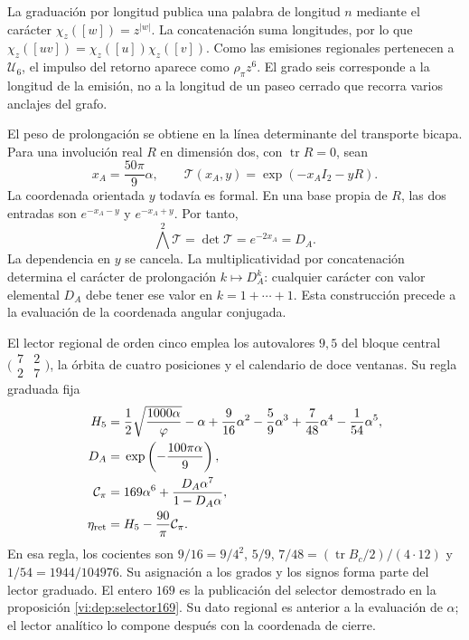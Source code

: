 La graduación por longitud publica una palabra de longitud \(n\)
mediante el carácter \(\chi_z([w])=z^{|w|}\). La concatenación
suma longitudes, por lo que
\(\chi_z([uv])=\chi_z([u])\chi_z([v])\). Como las emisiones
regionales pertenecen a \(\mathcal U_6\), el impulso del retorno
aparece como \(\rho_\pi z^6\). El grado seis corresponde a la
longitud de la emisión, no a la longitud de un paseo cerrado que
recorra varios anclajes del grafo.

El peso de prolongación se obtiene en la línea determinante del
transporte bicapa. Para una involución real \(R\) en dimensión dos,
con \(\operatorname{tr}R=0\), sean
\[
 x_A=\frac{50\pi}{9}\alpha,\qquad
 \mathcal T(x_A,y)=\exp(-x_AI_2-yR).
\]
La coordenada orientada \(y\) todavía es formal. En una base propia
de \(R\), las dos entradas son \(e^{-x_A-y}\) y
\(e^{-x_A+y}\). Por tanto,
\[
 \bigwedge^2\mathcal T=\det\mathcal T
 =e^{-2x_A}=D_A.
\]
La dependencia en \(y\) se cancela. La multiplicatividad por
concatenación determina el carácter de prolongación \(k\mapsto D_A^k\):
cualquier carácter con valor elemental \(D_A\) debe tener ese valor
en \(k=1+\cdots+1\). Esta construcción precede a la evaluación
de la coordenada angular conjugada.

El lector regional de orden cinco emplea los autovalores \(9,5\)
del bloque central \(\bigl(\begin{smallmatrix}7&2\\2&7\end{smallmatrix}\bigr)\),
la órbita de cuatro posiciones y el calendario de doce ventanas.
Su regla graduada fija
\begin{align}
 H_5={}&\frac12\sqrt{\frac{1000\alpha}{\varphi}}-\alpha
       +\frac9{16}\alpha^2-\frac59\alpha^3
       +\frac7{48}\alpha^4-\frac1{54}\alpha^5,\notag\\
 D_A={}&\exp\left(-\frac{100\pi\alpha}{9}\right),\notag\\
 \mathcal C_\pi={}&169\alpha^6+
                  \frac{D_A\alpha^7}{1-D_A\alpha},\notag\\
 \eta_{\rm ret}={}&H_5-\frac{90}{\pi}\mathcal C_\pi.
 \label{vi:dep:mantisas}
\end{align}
En esa regla, los cocientes son
\(9/16=9/4^2\), \(5/9\), \(7/48=(\operatorname{tr}B_c/2)/(4\cdot12)\)
y \(1/54=1944/104976\). Su asignación a los grados y los signos
forma parte del lector graduado. El entero \(169\) es la publicación
del selector demostrado en la proposición \ref{vi:dep:selector169}.
Su dato regional es anterior a la evaluación de \(\alpha\); el
lector analítico lo compone después con la coordenada de cierre.


